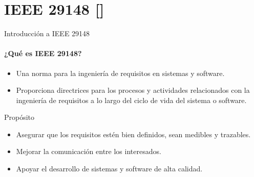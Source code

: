 \documentclass[
  24pt, %
  aspectratio=169, %
]{beamer}
\begin{document}
\section{IEEE 29148 [\cite{ieee}]}
\begin{frame}{Introducción a IEEE 29148}
\framesubtitle{¿Qué es IEEE 29148?}
\begin{itemize}
    \item Una norma para la ingeniería de requisitos en sistemas y software.
    \item Proporciona directrices para los procesos y actividades relacionados con la ingeniería de requisitos a lo largo del ciclo de vida del sistema o software.
\end{itemize}
\vspace{0.5cm}
Propósito
\begin{itemize}
    \item Asegurar que los requisitos estén bien definidos, sean medibles y trazables.
    \item Mejorar la comunicación entre los interesados.
    \item Apoyar el desarrollo de sistemas y software de alta calidad.
\end{itemize}
\end{frame}


\end{document}
